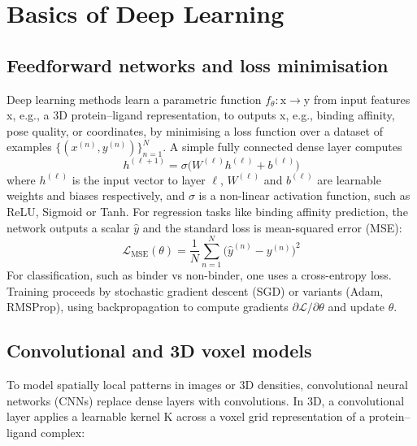 \documentclass[12pt]{article}
\begin{document}
\section{Basics of Deep Learning}

\subsection{Feedforward networks and loss minimisation}

Deep learning methods learn a parametric function $f_{\theta}: \textrm{x} \to \textrm{y}$ from input features x, e.g., a 3D protein–ligand representation, to outputs x, e.g., binding affinity, pose quality, or coordinates, by minimising a loss function over a dataset of examples $\{(x^{(n)}, y^{(n)})\}_{n=1}^{N}$. A simple fully connected dense layer computes
\begin{equation}
h^{(\ell+1)} = \sigma\!\big( W^{(\ell)} h^{(\ell)} + b^{(\ell)} \big)
\label{eq:deeplearn}
\end{equation}
where $h^{(\ell)}$ is the input vector to layer $\ell$, $W^{(\ell)}$ and $b^{(\ell)}$ are learnable weights and biases respectively, and $\sigma$ is a non-linear activation function, such as ReLU\cite{CH13_daubechies2022nonlinear}, Sigmoid\cite{CH13_narayan1997generalized} or Tanh. For regression tasks like binding affinity prediction, the network outputs a scalar $\hat{y}$ and the standard loss is mean-squared error (MSE):
\begin{equation}
\mathcal{L}_{\text{MSE}}(\theta) = \frac{1}{N} \sum_{n=1}^{N} \big( \hat{y}^{(n)} - y^{(n)} \big)^2
\label{eq:lossfunc}
\end{equation}
For classification, such as binder vs non-binder, one uses a cross-entropy loss. Training proceeds by stochastic gradient descent (SGD) or variants (Adam, RMSProp)\cite{CH13_zou2019sufficient}, using backpropagation to compute gradients $\partial \mathcal{L} / \partial \theta$ and update $\theta$.

\subsection{Convolutional and 3D voxel models}

To model spatially local patterns in images or 3D densities, convolutional neural networks (CNNs) replace dense layers with convolutions. In 3D, a convolutional layer applies a learnable kernel K across a voxel grid representation of a protein–ligand complex:
\end{document}
